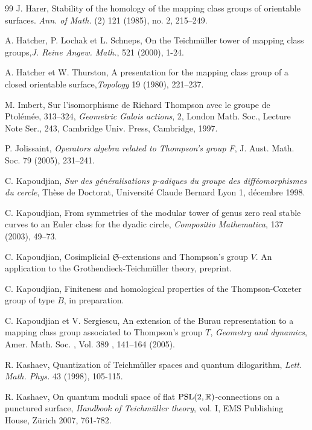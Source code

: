 \documentclass[twoside]{irmaems}
\theoremstyle{plain}
\theoremstyle{definition}
\theoremstyle{remark}
\newcommand{\R}{{\mathbb{R}}}
\begin{document}
\begin{small}
\begin{thebibliography}{99}
J. Harer, { Stability of the homology of the mapping class groups of orientable surfaces}. {\em   Ann. of Math.} (2)  121  (1985),  no. 2, 215--249.


 
      
A. Hatcher, P. Lochak  et L. Schneps, { On the Teichm\"uller tower of  mapping class groups},{\em   J. Reine Angew. Math.}, 521 (2000), 1-24.        

A. Hatcher et W. Thurston, {  A presentation for the mapping class         
  group of a closed orientable surface},{\em   Topology} 19 (1980), 221--237.     
  
M. Imbert, { Sur l'isomorphisme de Richard Thompson avec le groupe de Ptol\'em\'ee}, 313--324, {\em  Geometric Galois actions}, 2,  London Math. Soc., Lecture Note
Ser., 243, Cambridge Univ. Press, Cambridge, 1997.  



P. Jolissaint, {\em Operators algebra related to Thompson's group
F}, J. Aust. Math. Soc. 79 (2005), 231--241.

C. Kapoudjian, {\em Sur des g\'en\'eralisations p-adiques du groupe des
diff\'eomorphismes du cercle}, Th\`ese de Doctorat, Universit\'e Claude Bernard
Lyon 1, d\'ecembre 1998.




C. Kapoudjian, { From symmetries of the modular tower of genus zero real stable
curves to an Euler class for the dyadic circle}, {\em   Compositio Mathematica},  137 (2003),  49--73. 

C. Kapoudjian, { Cosimplicial $\mathfrak{S}$-extensions and Thompson's group $V$. An application
 to the Grothendieck-Teichm\"uller theory}, preprint.
 
C. Kapoudjian, { Finiteness and homological properties of the Thompson-Coxeter group of type $B$}, in preparation.
 
C. Kapoudjian et V. Sergiescu, { An extension of the Burau representation to a mapping class group
 associated to Thompson's group $T$},
{\em  Geometry and dynamics}, Amer. Math. Soc. , Vol. 389 , 141--164 (2005).



R. Kashaev, { Quantization of Teichm\"uller spaces and quantum 
dilogarithm}, {\em  Lett. Math. Phys.} 43 (1998), 105-115. 

R. Kashaev, { On quantum moduli space of flat ${\rm PSL}(2,\R)$-connections on a punctured surface},  
{\em  Handbook of Teichm\"uller theory}, vol. I, EMS Publishing House, Z\"urich 
2007, 761-782.  



\end{thebibliography}
\end{small}
\end{document}
